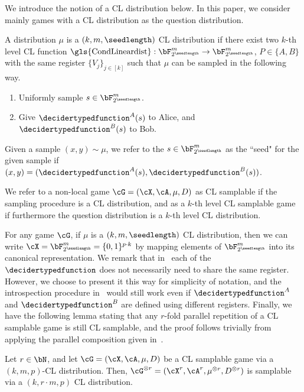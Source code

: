 We introduce the notion of a CL distribution below. In this paper, we consider mainly games with a CL distribution as the question distribution. 
\begin{definition} \label{def:CLdistribution}
	A distribution $\mu$ is a $(k, m, \seedlength)$ CL distribution if there exist two $k$-th level CL function $\text{\gls{CondLineardist}}: \bF_{2^{\seedlength}}^m \rightarrow \bF_{2^{\seedlength}}^m$, $P \in \{A,B\}$ with the same register $\{V_j\}_{j\in [k]}$ such that $\mu$ can be sampled in the following way.
	\begin{enumerate}
		\item Uniformly sample $s \in \bF_{2^{\seedlength}}^m$. 
		\item Give $\decidertypedfunction^A(s)$ to Alice, and $\decidertypedfunction^B(s)$ to Bob.
	\end{enumerate}
	Given a sample $(x,y) \sim \mu$,  we refer to the $s \in \bF_{2^{\seedlength}}^m$ as the ``seed" for the given sample if $(x,y) = (\decidertypedfunction^{A}(s), \decidertypedfunction^{B}(s))$.
\end{definition}
We refer to a non-local game $\cG= (\cX, \cA, \mu, D)$ as CL samplable if the sampling procedure is a CL distribution, and as a $k$-th level CL samplable game if furthermore the question distribution is a $k$-th level CL distribution. 

For any game $\cG$, if $\mu$ is a $(k, m, \seedlength)$ CL distribution, then we can write $\cX = \bF_{2^{\seedlength}}^m = \{0,1\}^{p \cdot k}$ by mapping elements of   $\bF_{2^{\seedlength}}^m$ into its canonical representation. We remark that in~\cite{jiMIPRE2022a} each of the $\decidertypedfunction$ does not necessarily need to share the same register. However, we choose to present it this way for simplicity of notation, and the introspection procedure in~ would still work even if $\decidertypedfunction^A$ and $\decidertypedfunction^B$ are defined using different registers. Finally, we have the following lemma stating that any $r$-fold parallel repetition of a CL samplable game is still CL samplable, and the proof follows trivially from applying the parallel composition given in~. 
\begin{lemma} \label{lem:parallelrefCLfunction}
	Let $r \in \bN$, and let $\cG = (\cX, \cA, \mu, D)$ be a CL samplable game via a $(k,m,p)$-CL distribution. Then, $\cG^{\otimes r} = (\cX^{r}, \cA^r, \mu^{\otimes r}, D^{\otimes r})$ is samplable via a $(k,r \cdot m,p)$ CL distribution. 
\end{lemma}

